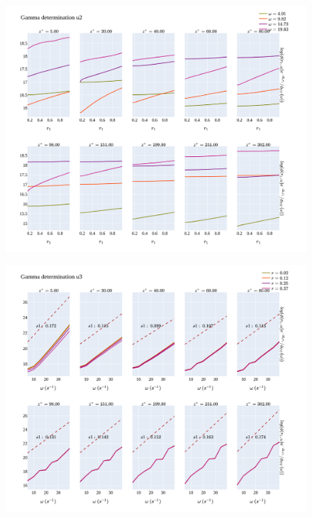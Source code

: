 \documentclass[]{article}
\theoremstyle{plain}
\theoremstyle{remark}
\begin{document}
\begin{figure}[h!]
	\begin{center}
		\includegraphics[width=\textwidth]{../output/channel_wrles_retau395/split_time/gamma/gamma_u2_r_all.png}
	\end{center}
\end{figure}

\begin{figure}[h!]
	\begin{center}
		\includegraphics[width=\textwidth]{../output/channel_wrles_retau395/split_time/gamma/gamma_u3_w_all.png}

	\end{center}
\end{figure}
\end{document}
